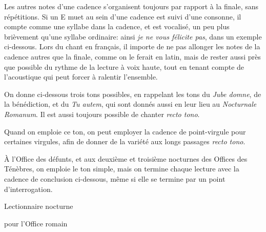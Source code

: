 \documentclass[twoside, french]{book}
\begin{document}
Les autres notes d'une cadence s'organisent toujours par rapport à la finale, sans répétitions. Si un E muet au sein d'une cadence est suivi d'une consonne,
il compte comme une syllabe dans la cadence, et est vocalisé, un peu plus brièvement qu'une syllabe ordinaire: ainsi \emph{je ne vous félicite pas}, dans un exemple ci-dessous.
Lors du chant en français, il importe de ne pas allonger les notes de la cadence autres que la finale, comme on le ferait en latin,
mais de rester aussi près que possible du rythme de la lecture à voix haute, tout en tenant compte de l'acoustique qui peut forcer à ralentir l'ensemble.

On donne ci-dessous trois tons possibles, en rappelant les tons du \emph{Jube domne}, de la bénédiction, et du \emph{Tu autem},
qui sont donnés aussi en leur lieu au \emph{Nocturnale Romanum}. Il est aussi toujours possible de chanter \emph{recto tono}.


\vspace{1cm}
\vspace{4mm}
Quand on emploie ce ton, on peut employer la cadence de point-virgule pour certaines virgules, afin de donner de la variété aux longs passages \emph{recto tono}.


\pagebreak
{}

\vspace{1cm}

\vspace{1cm}
\vspace{4mm}
À l'Office des défunts, et aux deuxième et troisième nocturnes des Offices des Ténèbres, on emploie le ton simple,
mais on termine chaque lecture avec la cadence de conclusion ci-dessous, même si elle se termine par un point d'interrogation.


\setlength{\parindent}{0mm}


\cleardoublepage
{}
\begin{titlepage}
\begin{center}
\null

\vspace{8cm}

{\Huge Lectionnaire nocturne}

\vspace{1cm}

{\Large pour l'Office romain}

\vfill

\end{center}
\end{titlepage}
\end{document}
